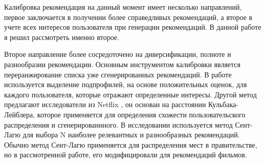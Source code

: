 Калибровка рекомендация на данный момент имеет несколько направлений,
 первое заключается в получении более справедливых рекомендаций, а второе 
 в учете всех интересов пользователя при генерации рекомендаций. 
 В данной работе я решил рассмотреть именно второе.

  Второе направление более сосредоточено на диверсификации, 
  полноте и разнообразии рекомендации. Основным инструментом 
  калибровки является переранжирование списка уже сгенерированных
   рекомендаций. В работе \cite{bib3} используется выделение подпрофилей, 
   на основе положительных оценок, 
   для каждого пользователя, которые отражают 
   определенные интересы. Другой метод предлагают исследователи из 
   Netflix \cite{bib4}, он основан на расстоянии Кульбака-Лейблера, 
   которое применяется для определения схожести пользовательского 
   распределения и сгенерированнного. В исследовании \cite{bib5} 
   используется метод Сент-Лагю для выбора N наиболее релевантных и 
   разнообразных рекомендаций. Обычно метод Сент-Лагю применяется для 
   распределения мест в правительстве, но в рассмотренной работе, его 
   модифицировали для рекомендаций фильмов.
